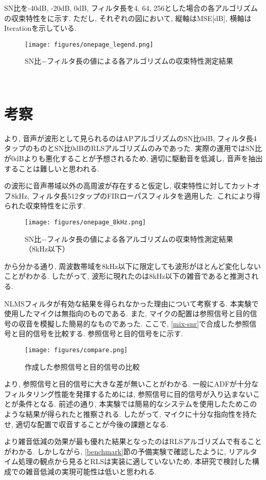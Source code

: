 SN比を-40dB, -20dB, 0dB, フィルタ長を4, 64, 256とした場合の各アルゴリズムの収束特性をに示す. ただし, それぞれの図において, 縦軸はMSE{[}dB{]}, 横軸はIterationを示している. 

\begin{figure}[H]
\centering
\texttt{[image: figures/onepage\_legend.png]}
\label{fig:onepage}
\caption{SN比−フィルタ長の値による各アルゴリズムの収束特性測定結果}
\end{figure}

\
\section{考察}\label{consideration-practice}

より, 音声が波形として見られるのはAPアルゴリズムのSN比0dB, フィルタ長4タップのものとSN比0dBのRLSアルゴリズムのみであった. 実際の運用ではSN比が0dBよりも悪化することが予想されるため, 適切に駆動音を低減し, 音声を抽出することは難しいと思われる. 

の波形に音声帯域以外の高周波が存在すると仮定し, 収束特性に対してカットオフ8kHz, フィルタ長512タップのFIRローパスフィルタを適用した. これにより得られた収束特性をに示す. 

\begin{figure}[H]
\centering
\texttt{[image: figures/onepage\_8kHz.png]}
\label{fig:onepage_8kHz}
\caption{SN比−フィルタ長の値による各アルゴリズムの収束特性測定結果（8kHz以下）}
\end{figure}

から分かる通り, 周波数帯域を8kHz以下に限定しても波形がほとんど変化しないことがわかる. したがって, 波形に現れたのは8kHz以下の雑音であると推測される. 

NLMSフィルタが有効な結果を得られなかった理由について考察する. 本実験で使用したマイクは無指向のものである. また, マイクの配置は参照信号と目的信号の収音を模擬した簡易的なものであった. ここで, \ref{mix-snr}で合成した参照信号と目的信号を比較する. 参照信号と目的信号をに示す. 

\begin{figure}[H]
\centering
\texttt{[image: figures/compare.png]}
\caption{作成した参照信号と目的信号の比較}
\label{fig:compare_x_d}
\end{figure}

より, 参照信号と目的信号に大きな差が無いことがわかる. 一般にADFが十分なフィルタリング性能を発揮するためには, 参照信号に目的信号が入り込まないことが条件となる. 前述の通り, 本実験では簡易的なシステムを使用したためこのような結果が得られたと推察される. したがって, マイクに十分な指向性を持たせ, 適切な配置で収音することが今後の課題となる. 

より雑音低減の効果が最も優れた結果となったのはRLSアルゴリズムで有ることがわかる. しかしながら, \ref{benchmark}節の予備実験で確認したように, リアルタイム処理の観点から見るとRLSは実装に適していないため, 本研究で検討した構成での雑音低減の実現可能性は低いと思われる. 
